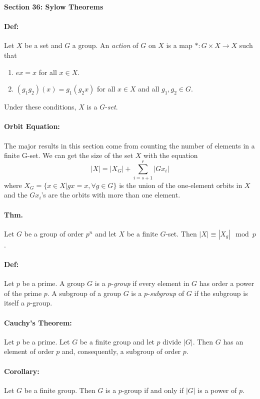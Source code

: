 \documentclass[10pt,a4paper]{article}
\begin{document}
\begin{center}
\textbf{Section 36: Sylow Theorems}
\end{center}

\paragraph{Def:} Let $X$ be a set and $G$ a group. An \textit{action} of $G$ on $X$ is a map $*: G \times X \to X$ such that
\begin{enumerate}
\item $ex = x$ for all $x \in X$.
\item $(g_1g_2)(x) = g_1(g_2x)$ for all $x \in X$ and all $g_1, g_2 \in G$.
\end{enumerate}
Under these conditions, $X$ is a $G$-\textit{set}.

\paragraph{Orbit Equation:} The major results in this section come from counting the number of  elements in a finite G-set. We can get the size of the set $X$ with the equation
$$ |X| = |X_G| + \sum_{i=s+1}^r |Gx_i|$$
where $X_G = \{ x \in X | gx = x, \forall g \in G\}$ is the union of the one-element orbits in $X$ and the $Gx_i$'s are the orbits with more than one element.

\paragraph{Thm.} Let $G$ be a group of order $p^n$ and let $X$ be a finite $G$-set. Then $|X| \equiv |X_g| \mod p$.

\paragraph{Def:} Let $p$ be a prime. A group $G$ is a $p$-\textit{group} if every element in $G$ has order a power of the prime $p$. A subgroup of a group $G$ is a $p$-\textit{subgroup} of $G$ if the subgroup is itself a $p$-group.

\paragraph{Cauchy's Theorem:} Let $p$ be a prime. Let $G$ be a finite group and let $p$ divide $|G|$. Then $G$ has an element of order $p$ and, consequently, a subgroup of order $p$.

\paragraph{Corollary:} Let $G$ be a finite group. Then $G$ is a $p$-group if and only if $|G|$ is a power of $p$.
\end{document}
